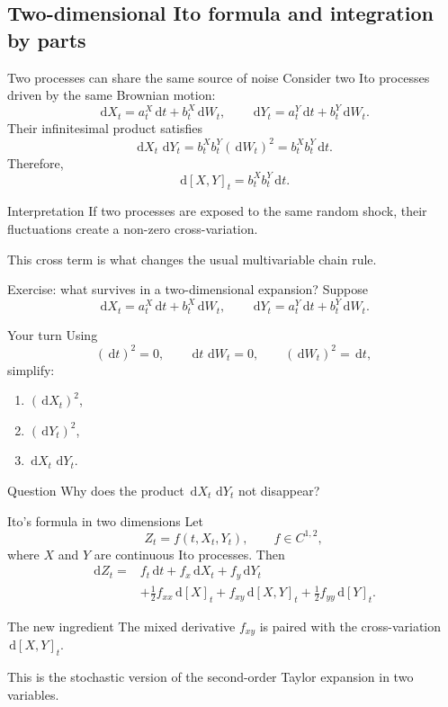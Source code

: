 \documentclass[handout,10pt,aspectratio=169]{beamer}
\newcommand{\dd}{\,\mathrm d}
\begin{document}
\subsection{Two-dimensional Ito formula and integration by parts}

\begin{frame}{Two processes can share the same source of noise}
Consider two Ito processes driven by the same Brownian motion:
\[
\dd X_t=a_t^X\dd t+b_t^X\dd W_t,
\qquad
\dd Y_t=a_t^Y\dd t+b_t^Y\dd W_t.
\]
Their infinitesimal product satisfies
\[
\dd X_t\,\dd Y_t
=
b_t^Xb_t^Y(\dd W_t)^2
=
b_t^Xb_t^Y\dd t.
\]
Therefore,
\[
\boxed{\dd[X,Y]_t=b_t^Xb_t^Y\dd t.}
\]

\begin{block}{Interpretation}
If two processes are exposed to the same random shock, their fluctuations
create a non-zero cross-variation.
\end{block}

This cross term is what changes the usual multivariable chain rule.
\end{frame}


\begin{frame}{Exercise: what survives in a two-dimensional expansion?}
Suppose
\[
\dd X_t=a_t^X\dd t+b_t^X\dd W_t,
\qquad
\dd Y_t=a_t^Y\dd t+b_t^Y\dd W_t.
\]

\begin{block}{Your turn}
Using
\[
(\dd t)^2=0,
\qquad
\dd t\,\dd W_t=0,
\qquad
(\dd W_t)^2=\dd t,
\]
simplify:
\begin{enumerate}
    \item \((\dd X_t)^2\),
    \item \((\dd Y_t)^2\),
    \item \(\dd X_t\,\dd Y_t\).
\end{enumerate}
\end{block}

\begin{alertblock}{Question}
Why does the product \(\dd X_t\,\dd Y_t\) not disappear?
\end{alertblock}
\end{frame}


\begin{frame}{Ito's formula in two dimensions}
Let
\[
Z_t=f(t,X_t,Y_t),
\qquad f\in C^{1,2},
\]
where \(X\) and \(Y\) are continuous Ito processes. Then
\[
\boxed{
\begin{aligned}
\dd Z_t
={}&f_t\dd t
+f_x\dd X_t
+f_y\dd Y_t\\
&+\frac12 f_{xx}\dd[X]_t
+f_{xy}\dd[X,Y]_t
+\frac12 f_{yy}\dd[Y]_t.
\end{aligned}}
\]

\begin{block}{The new ingredient}
The mixed derivative \(f_{xy}\) is paired with the cross-variation
\(\dd[X,Y]_t\).
\end{block}

This is the stochastic version of the second-order Taylor expansion in two variables.
\end{frame}
\end{document}
